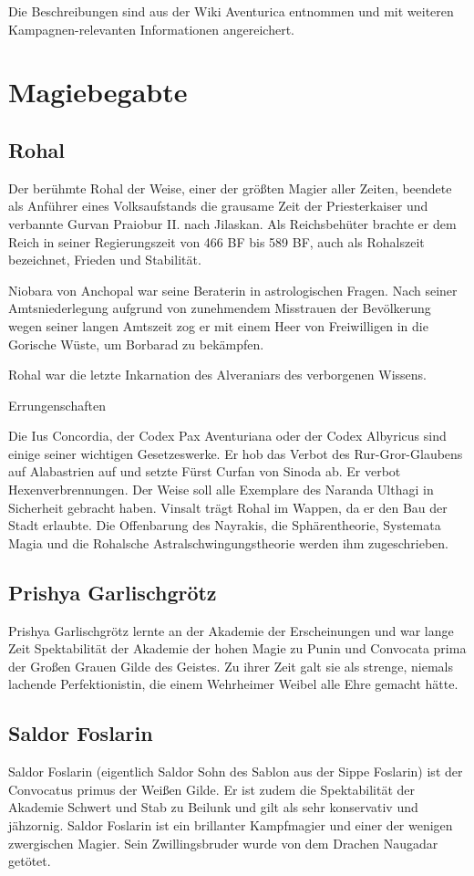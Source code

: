 Die Beschreibungen sind aus der Wiki Aventurica entnommen und mit weiteren Kampagnen-relevanten Informationen angereichert.

\section{Magiebegabte}
\subsection{Rohal}
Der berühmte Rohal der Weise, einer der größten Magier aller Zeiten, beendete als Anführer eines Volksaufstands die grausame Zeit der Priesterkaiser und verbannte Gurvan Praiobur II. nach Jilaskan. Als Reichsbehüter brachte er dem Reich in seiner Regierungszeit von 466 BF bis 589 BF, auch als Rohalszeit bezeichnet, Frieden und Stabilität.

Niobara von Anchopal war seine Beraterin in astrologischen Fragen. Nach seiner Amtsniederlegung aufgrund von zunehmendem Misstrauen der Bevölkerung wegen seiner langen Amtszeit zog er mit einem Heer von Freiwilligen in die Gorische Wüste, um Borbarad zu bekämpfen.

Rohal war die letzte Inkarnation des Alveraniars des verborgenen Wissens.

Errungenschaften

Die Ius Concordia, der Codex Pax Aventuriana oder der Codex Albyricus sind einige seiner wichtigen Gesetzeswerke.
Er hob das Verbot des Rur-Gror-Glaubens auf Alabastrien auf und setzte Fürst Curfan von Sinoda ab.
Er verbot Hexenverbrennungen.
Der Weise soll alle Exemplare des Naranda Ulthagi in Sicherheit gebracht haben.
Vinsalt trägt Rohal im Wappen, da er den Bau der Stadt erlaubte.
Die Offenbarung des Nayrakis, die Sphärentheorie, Systemata Magia und die Rohalsche Astralschwingungstheorie werden ihm zugeschrieben.

\subsection{Prishya Garlischgrötz}
Prishya Garlischgrötz lernte an der Akademie der Erscheinungen und war lange Zeit Spektabilität der Akademie der hohen Magie zu Punin und Convocata prima der Großen Grauen Gilde des Geistes. Zu ihrer Zeit galt sie als strenge, niemals lachende Perfektionistin, die einem Wehrheimer Weibel alle Ehre gemacht hätte. 

\subsection{Saldor Foslarin}
Saldor Foslarin (eigentlich Saldor Sohn des Sablon aus der Sippe Foslarin) ist der Convocatus primus der Weißen Gilde. Er ist zudem die Spektabilität der Akademie Schwert und Stab zu Beilunk und gilt als sehr konservativ und jähzornig. Saldor Foslarin ist ein brillanter Kampfmagier und einer der wenigen zwergischen Magier. Sein Zwillingsbruder wurde von dem Drachen Naugadar getötet. 

